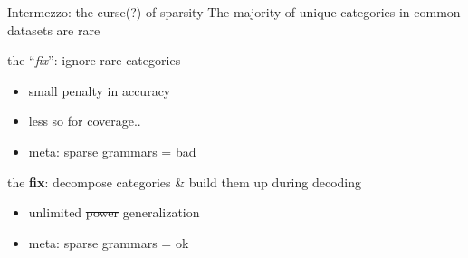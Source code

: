\documentclass{beamer}
\begin{document}
\begin{frame}{Intermezzo: the curse(?) of sparsity}
    \smaller
    The majority of unique categories in common datasets are \alert{rare}
    \vfill

    \pause
    the ``\textit{fix}'': ignore rare categories
    \begin{itemize}
        \item small penalty in accuracy
        \item less so for coverage..
        \item meta: sparse grammars = bad
    \end{itemize}
    
    \vfill
    
    \pause
    the \textbf{fix}: decompose categories \& build them up during decoding
    \begin{itemize}
        \item[\textcolor{blue}{\lightning}] unlimited \sout{power} generalization
        \item meta: sparse grammars = ok
    \end{itemize}
\end{frame}
\end{document}
